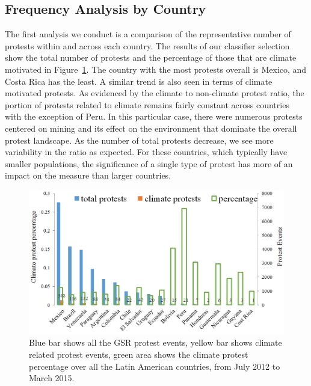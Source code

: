 \documentclass[9pt,twocolumn,twoside]{pnas-new}
\begin{document}
\subsection{Frequency Analysis by Country}
The first analysis we conduct is a comparison of the representative number of protests within and across each country.
The results of our classifier selection show the total number of protests and the percentage of those that are climate motivated in Figure~\ref{month_percentage}.
The country with the most protests overall is Mexico, and Costa Rica has the least.
A similar trend is also seen in terms of climate motivated protests.
As evidenced by the climate to non-climate protest ratio, the portion of protests related to climate remains fairly constant across countries with the exception of Peru.
In this particular case, there were numerous protests centered on mining and its effect on the environment that dominate the overall protest landscape.
As the number of total protests decrease, we see more variability in the ratio as expected.
For these countries, which typically have smaller populations, the significance of a single type of protest has more of an impact on the measure than larger countries.

\begin{figure}[htb]
\centerline
{\includegraphics[width=.48\textwidth]{figures/month-country-protest3}}
\caption{Blue bar shows all the GSR protest events, yellow bar shows climate related protest events, green area shows the climate protest percentage over all the Latin American countries, from July 2012 to March 2015.}
\label{month_percentage}
\end{figure}


\end{document}

